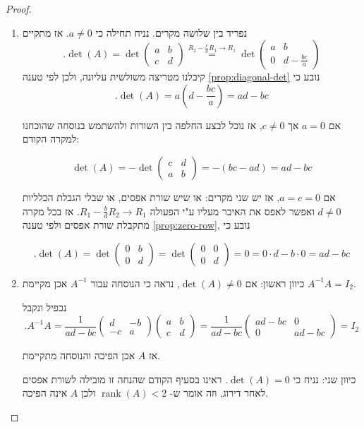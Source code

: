 \documentclass[12pt]{report}
\theoremstyle{plain}
\theoremstyle{definition}
\DeclareMathOperator{\rank}{rank}
\newcommand{\0}{\mathbf{0}}
\begin{document}
\begin{proof}\
\begin{enumerate}[label=\alph*.]
\item
נפריד בין שלושה מקרים.
נניח תחילה כי
$a\neq 0$.
אז מתקיים
$$
.\det(A)=\det\!\begin{pmatrix}
a & b \\
c & d
\end{pmatrix}\overset{R_2-\frac{c}{a}R_1 \to R_1}{=} \det\!\begin{pmatrix}
a & b \\
0 & d-\frac{bc}{a}
\end{pmatrix}
$$
קיבלנו מטריצה משולשית עליונה, ולכן לפי טענה 
\ref{prop:diagonal-det}
נובע כי
$$
.\det(A)=a(d-\frac{bc}{a})=ad-bc
$$

אם 
$a=0$
אך
$c\neq 0$,
אז נוכל לבצע החלפה בין השורות ולהשתמש בנוסחה שהוכחנו למקרה הקודם:

$$
\det(A)=-\det\!\begin{pmatrix}
c & d \\
a & b
\end{pmatrix}
=-(bc-ad)=ad-bc
$$

אם
$a=c=0$,
אז יש שני מקרים: או שיש שורת אפסים,
או שבלי הגבלת הכלליות
$d\neq 0$
ואפשר לאפס את האיבר מעליו ע"י הפעולה
$R_1-\frac{b}{d}R_2\to R_1$.
אז בכל מקרה מתקבלת שורת אפסים ולפי טענה
\ref{prop:zero-row},
נובע כי

$$
.\det(A)=\det\!\begin{pmatrix}
    0 & b \\
    0 & d
    \end{pmatrix}=\det\!\begin{pmatrix}
    0 & 0 \\
    0 & d
    \end{pmatrix}=0=0\cdot d-b\cdot 0=ad-bc
$$

\item 
כיוון ראשון: אם
$\det(A)\neq 0$,
נראה כי הנוסחה עבור
$A^{-1}$
אכן מקיימת
$A^{-1}A=I_2$.

נכפיל ונקבל
$$
.A^{-1}A=\frac{1}{ad-bc}\begin{pmatrix}
d & -b \\
-c & a
\end{pmatrix}\begin{pmatrix}
a & b \\
c & d
\end{pmatrix}=\frac{1}{ad-bc}\begin{pmatrix}
ad-bc & 0 \\
0 & ad-bc 
\end{pmatrix}=I_2
$$

אז
$A$
אכן הפיכה והנוסחה מתקיימת.

כיוון שני: נניח כי 
$\det(A)=0$.
ראינו בסעיף הקודם שהנחה זו מובילה לשורת אפסים לאחר דירוג, וזה אומר ש-
$\rank(A)<2$
ולכן 
$A$
אינה הפיכה.

\end{enumerate}
\end{proof}
\end{document}
